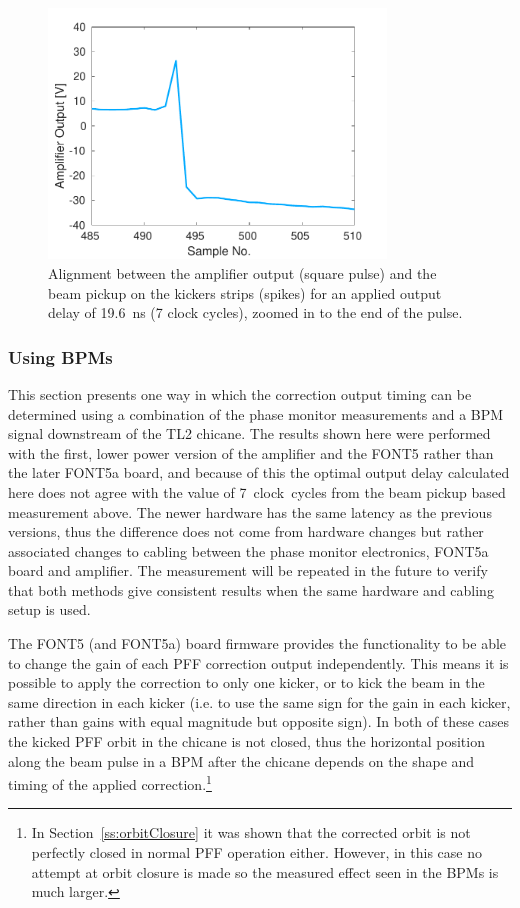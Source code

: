 \begin{figure}
  \centering
  \includegraphics[width=0.8\textwidth]{Figures/commissioning/absDelay7_end}
  \caption{Alignment between the amplifier output (square pulse) and the beam pickup on the kickers strips (spikes) for an applied output delay of 19.6~ns (7 clock cycles), zoomed in to the end of the pulse.}
  \label{f:absDelay7_end}
\end{figure}


\subsubsection{Using BPMs}
\label{sss:relativeBPM}

This section presents one way in which the correction output timing can be determined using a combination of the phase monitor measurements and a BPM signal downstream of the TL2 chicane. The results shown here were performed with the first, lower power version of the amplifier and the FONT5 rather than the later FONT5a board, and because of this the optimal output delay calculated here does not agree with the value of 7~clock~cycles from the beam pickup based measurement above. The newer hardware has the same latency as the previous versions, thus the difference does not come from hardware changes but rather associated changes to cabling between the phase monitor electronics, FONT5a board and amplifier. The measurement will be repeated in the future to verify that both methods give consistent results when the same hardware and cabling setup is used.

The FONT5 (and FONT5a) board firmware provides the functionality to be able to change the gain of each PFF correction output independently. This means it is possible to apply the correction to only one kicker, or to kick the beam in the same direction in each kicker (i.e. to use the same sign for the gain in each kicker, rather than gains with equal magnitude but opposite sign). In both of these cases the kicked PFF orbit in the chicane is not closed, thus the horizontal position along the beam pulse in a BPM after the chicane depends on the shape and timing of the applied correction.\footnote{In Section~\ref{ss:orbitClosure} it was shown that the corrected orbit is not perfectly closed in normal PFF operation either. However, in this case no attempt at orbit closure is made so the measured effect seen in the BPMs is much larger.}

